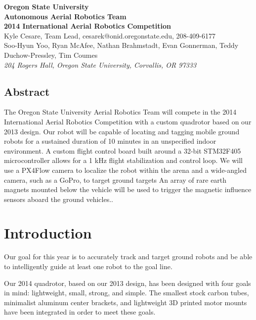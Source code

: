\documentclass[12pt,letterpaper]{article} \usepackage[margin=1in]{geometry}
\begin{document}
\begin{center}
	{\bf\Large Oregon State University \\
		Autonomous Aerial Robotics Team \\
		2014 International Aerial Robotics Competition \\ [1em]
	}
	{\footnotesize Kyle Cesare, Team Lead, cesarek@onid.oregonstate.edu, 208-409-6177 \\
		Soo-Hyun Yoo, Ryan McAfee, Nathan Brahmstadt, Evan Gonnerman, Teddy Duchow-Pressley, Tim Coumes  \\ [0.5em]
		\emph{204 Rogers Hall, Oregon State University, Corvallis, OR 97333}
	}
\end{center}


\begin{center} \begin{minipage}{5.5in}

\section*{Abstract}

The Oregon State University Aerial Robotics Team will compete in the 2014
International Aerial Robotics Competition with a custom quadrotor based on our
2013 design. Our robot will be capable of locating and tagging mobile ground
robots for a sustained duration of 10 minutes in an unspecified indoor
environment. A custom flight control board built around a 32-bit STM32F405
microcontroller allows for a 1 kHz flight stabilization and control loop. We will
use a PX4Flow camera to localize the robot within the arena and a wide-angled
camera, such as a GoPro, to target ground targets An array of rare earth magnets
mounted below the vehicle will be used to trigger the magnetic influence sensors
aboard the ground vehicles..

\end{minipage} \end{center}



\section*{Introduction}

Our goal for this year is to accurately track and target ground robots and be
able to intelligently guide at least one robot to the goal line.

Our 2014 quadrotor, based on our 2013 design, has been designed with four goals
in mind: lightweight, small, strong, and simple. The smallest stock carbon
tubes, minimalist aluminum center brackets, and lightweight 3D printed motor
mounts have been integrated in order to meet these goals.
\end{document}
